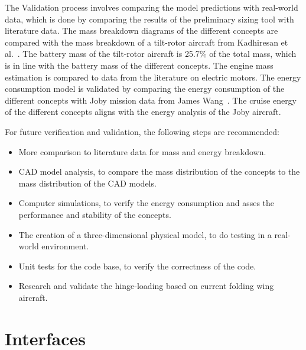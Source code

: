 The Validation process involves comparing the model predictions with real-world data, which is done by comparing the results of the preliminary sizing tool with literature data.
The mass breakdown diagrams of the different concepts are compared with the mass breakdown of a tilt-rotor aircraft from Kadhiresan et al.~\cite{Kadhiresan_Duffy_2019}.
The battery mass of the tilt-rotor aircraft is 25.7\% of the total mass, which is in line with the battery mass of the different concepts.
The engine mass estimation is compared to data from the literature on electric motors.
The energy consumption model is validated by comparing the energy consumption of the different concepts with Joby mission data from James Wang~\cite{weightperformanceslides}.
The cruise energy of the different concepts aligns with the energy analysis of the Joby aircraft.

For future verification and validation, the following steps are recommended:
\begin{itemize}
    \item More comparison to literature data for mass and energy breakdown.
    \item CAD model analysis, to compare the mass distribution of the concepts to the mass distribution of the CAD models.
    \item Computer simulations, to verify the energy consumption and asses the performance and stability of the concepts.
    \item The creation of a three-dimensional physical model, to do testing in a real-world environment.
    \item Unit tests for the code base, to verify the correctness of the code.
    \item Research and validate the hinge-loading based on current folding wing aircraft.
\end{itemize}

\section*{Interfaces}


